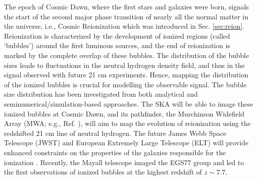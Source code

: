 The epoch of Cosmic Dawn, where the first stars and galaxies were born, signals the start of the second major phase transition of nearly all the normal matter in the universe, i.e., Cosmic Reionization which was introduced in Sec. \ref{sec:reion}. 
Reionization is characterized by the development of ionized regions (called ‘bubbles’) around the first luminous sources, and the end of reionization is marked by the complete overlap of these bubbles. The distribution of the bubble sizes leads to fluctuations in the neutral hydrogen density field, and thus in the signal observed with future 21 cm experiments. Hence, mapping the distribution of the ionized bubbles is crucial for modelling the observable signal. The bubble size distribution has been investigated from both analytical \cite{Furlanetto:2004ha, hpaseem} and seminumerical/simulation-based \cite{choudhury2021, molaro2019, mesinger2011} approaches.
The SKA will be able to image these ionized bubbles at Cosmic Dawn, and its pathfinder, the Murchinson Widefield Array (MWA; e.g., Ref. \cite{lonsdale2009}), will aim to map the evolution of reionization using the redshifted 21 cm line of neutral hydrogen. The future James Webb Space Telescope (JWST) and European Extremely Large Telescope (ELT) will provide enhanced constraints on the properties of the galaxies responsible for the ionization \cite{park2020, zackrisson2020}. Recently, the Mayall telescope imaged the EGS77 group \cite{tilvi2020} and led to the first observations of ionized bubbles at the highest redshift of $z \sim 7.7$. 




